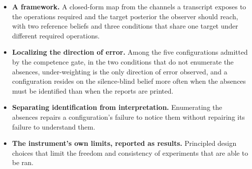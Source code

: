 \documentclass{article}
\theoremstyle{plain}
\theoremstyle{definition}
\theoremstyle{remark}
\begin{document}
\begin{itemize}
\itemsep0em
  \item \textbf{A framework.} A closed-form map from the channels a
    transcript exposes to the operations required and the target posterior the
    observer should reach, with two reference beliefs and three conditions
    that share one target under different required operations.
  \item \textbf{Localizing the direction of error.} Among the five
    configurations admitted by the competence gate, in the two conditions that
    do not enumerate the absences, under-weighting is the only direction of
    error observed, and a configuration resides on the silence-blind belief more
    often when the absences must be identified than when the reports are printed.
  \item \textbf{Separating identification from interpretation.} Enumerating the
    absences repairs a configuration's failure to notice them without repairing
    its failure to understand them.
  \item \textbf{The instrument's own limits, reported as results.} Principled 
    design choices that limit the freedom and consistency of experiments that 
    are able to be ran.
\end{itemize}
\end{document}
